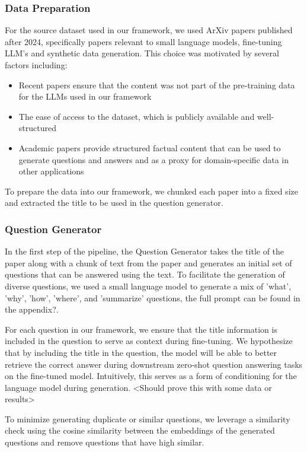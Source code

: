 \subsubsection{Data Preparation}
For the source dataset used in our framework, we used ArXiv papers published after 2024, specifically papers relevant to
small language models, fine-tuning LLM's and synthetic data generation.
This choice was motivated by several factors including:
\begin{itemize}
  \item Recent papers ensure that the content was not part of the pre-training data for the LLMs used in our framework
  \item The ease of access to the dataset, which is publicly available and well-structured
  \item Academic papers provide structured factual content that can be used to generate questions and answers and as a proxy for
  domain-specific data in other applications
\end{itemize}

To prepare the data into our framework, we chunked each paper into a fixed size and extracted the title to be used in the
question generator.

\subsubsection{Question Generator}

In the first step of the pipeline, the Question Generator takes the title of the paper along with a chunk of text from the paper
and generates an initial set of questions that can be answered using the text. To facilitate the generation of diverse questions,
we used a small language model to generate a mix of 'what', 'why', 'how', 'where', and 'summarize' questions, the full prompt can be found in the appendix?.

For each question in our framework, we ensure that the title information is included in the question to serve as context during fine-tuning. We hypothesize
that by including the title in the question, the model will be able to better retrieve the correct answer during downstream zero-shot question answering tasks on the fine-tuned
model. Intuitively, this serves as a form of conditioning for the language model during generation. <Should prove this with some data or results>

To minimize generating duplicate or similar questions, we leverage a similarity check using the cosine similarity between the embeddings of the generated questions
and remove questions that have high similar.

